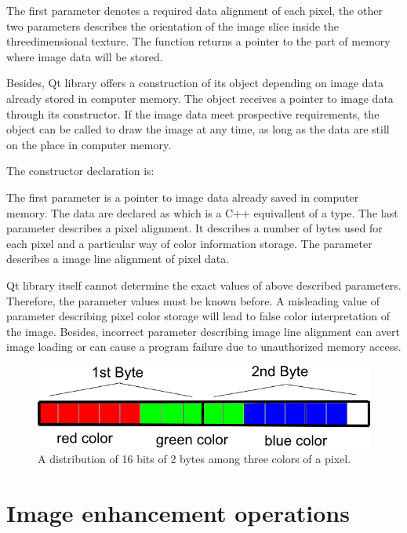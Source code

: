 The first parameter denotes a required data alignment of each pixel, the other two parameters describes the orientation of the image slice inside the threedimensional texture. The function returns a pointer to the part of memory where image data will be stored.

Besides, Qt library offers a construction of its object depending on image data already stored in computer memory. The object receives a pointer to image data through its constructor. If the image data meet prospective requirements, the object can be called to draw the image at any time, as long as the data are still on the place in computer memory.

The constructor declaration is:


The first parameter is a pointer to image data already saved in computer memory. The data are declared as  which is a C++ equivallent of a  type. The last parameter  describes a pixel alignment. It describes a number of bytes used for each pixel and a particular way of color information storage. The  parameter describes a image line alignment of pixel data.

Qt library itself cannot determine the exact values of above described parameters. Therefore, the parameter values must be known before. A misleading value of parameter describing pixel color storage will lead to false color interpretation of the image. Besides, incorrect parameter describing image line alignment can avert image loading or can cause a program failure due to unauthorized memory access.  


\begin{figure}
	\begin{center}
	\includegraphics[width=130mm]{Text/IMG/ImageStoring_16bit.png}
	\end{center}
	\caption{A distribution of 16 bits of 2 bytes among three colors of a pixel.}
	\label{screenshot}
\end{figure}

\section{Image enhancement operations}
\label{brightnesscontrast}

